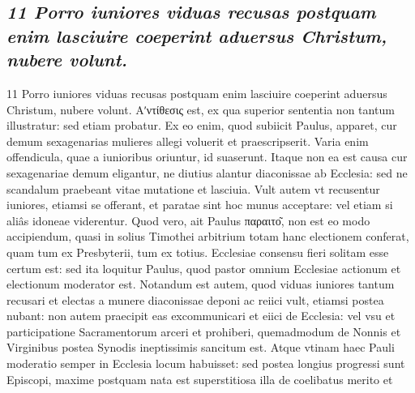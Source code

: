 \documentclass{article}
\begin{document}
\begin{pages}
\subsection*{\textit{11 Porro iuniores viduas recusas postquam enim lasciuire coeperint aduersus Christum, nubere volunt.}}11 Porro iuniores viduas recusas postquam enim lasciuire coeperint aduersus Christum, nubere volunt. Αʹντίθεσις est, ex qua superior sententia non tantum illustratur: sed etiam probatur. Ex eo enim, quod subiicit Paulus, apparet, cur demum sexagenarias mulieres allegi voluerit et praescripserit. Varia enim offendicula, quae a iunioribus oriuntur, id suaserunt. Itaque non ea est causa cur sexagenariae demum eligantur, ne diutius alantur diaconissae ab Ecclesia: sed ne scandalum praebeant vitae mutatione et lasciuia. Vult autem vt recusentur iuniores, etiamsi se offerant, et paratae sint hoc munus acceptare: vel etiam si aliâs idoneae viderentur. Quod vero, ait Paulus παραιτο͂, non est eo modo accipiendum, quasi in solius Timothei arbitrium totam hanc electionem conferat, quam tum ex Presbyterii, tum ex totius. Ecclesiae consensu fieri solitam esse certum est: sed ita loquitur Paulus, quod pastor omnium Ecclesiae actionum et electionum moderator est. Notandum est autem, quod viduas iuniores tantum recusari et electas a munere diaconissae deponi ac reiici vult, etiamsi postea nubant: non autem praecipit eas excommunicari et eiici de Ecclesia: vel vsu et participatione Sacramentorum arceri et prohiberi, quemadmodum de Nonnis et Virginibus postea Synodis ineptissimis sancitum est. Atque vtinam haec Pauli moderatio semper in Ecclesia locum habuisset: sed postea longius progressi sunt Episcopi, maxime postquam nata est superstitiosa illa de coelibatus merito et  \pend

\end{pages}
\end{document}
